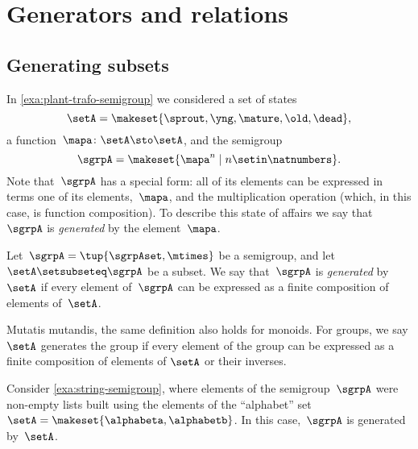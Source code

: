 
\section{Generators and relations}


\subsection{Generating subsets}

In \cref{exa:plant-trafo-semigroup} we considered a set of states
%
\begin{equation}
    \setA= \makeset{ \sprout, \yng, \mature, \old, \dead },
\end{equation}
%
a function~$\mapa \colon \setA \sto \setA$, and the semigroup
%
\begin{equation}
    \label{eq:trafo-sgrp-one-gen}
    \sgrpA = \makeset{ \mapa^n \mid n \setin \natnumbers }.
\end{equation}
%
Note that~$\sgrpA$ has a special form: all of its elements can be expressed in terms one of its elements,~$\mapa$, and the multiplication operation (which, in this case, is function composition).
To describe this state of affairs we say that~$\sgrpA$ is \emph{generated} by the element~$\mapa$.

\begin{ctdefinition}
    \label{def:gen-semigrp}
    Let~$\sgrpA = \tup{\sgrpAset, \mtimes}$ be a semigroup, and let~$\setA \setsubseteq \sgrpA$ be a subset.
    We say that~$\sgrpA$ is \emph{generated} by~$\setA$ if every element of~$\sgrpA$ can be expressed as a finite composition of elements of~$\setA$.
\end{ctdefinition}

\begin{remark}
    Mutatis mutandis, the same definition also holds for monoids.
    For groups, we say $\setA$ generates the group if every element of the group can be expressed as a finite composition of elements of $\setA$ or their inverses.
\end{remark}

\begin{example}
    Consider \cref{exa:string-semigroup}, where elements of the semigroup~$\sgrpA$ were non-empty lists built using the elements of the ``alphabet'' set~$\setA = \makeset{ \alphabeta, \alphabetb}$.
    In this case,~$\sgrpA$ is generated by~$\setA$.
\end{example}


